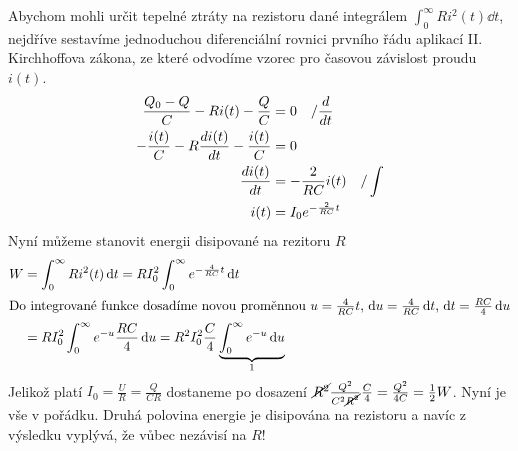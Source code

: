 \begin{mdframed}[style=mdexam]
\begin{example}
    Abychom mohli určit tepelné ztráty na rezistoru dané integrálem \(\int_{0}^{\infty}
    Ri^2(t)\dd{t}\), nejdříve sestavíme jednoduchou diferenciální rovnici prvního řádu aplikací II.
    Kirchhoffova zákona, ze které odvodíme vzorec pro časovou závislost proudu \(i(t)\). 
    \begin{align*}
      \frac{Q_0 - Q}{C} - Ri(t) - \frac{Q}{C}           &= 0 \quad/\dfrac{d  }{d t}             \\
      -\frac{i(t)}{C} - R\dfrac{d i(t)}{d t} - \frac{i(t)}{C} &= 0                              \\
                                          \dfrac{d i(t)}{d t} &= - \frac{2}{RC}i(t) \quad/\int  \\
                                                   i(t) &= I_0e^{-\frac{2}{RC}t}
    \end{align*}
    Nyní můžeme stanovit energii disipované na rezitoru \(R\)
    \begin{align*}
      W   &= \int_{0}^{\infty}Ri^2(t)\dd{t} = RI_0^2\int_{0}^{\infty}e^{-\frac{4}{RC}t}\dd{t}   \\
      \shortintertext{Do integrované funkce dosadíme novou proměnnou \(u = \frac{4}{RC}t\), \(\dd{u} 
                      = \frac{4}{RC}\dd{t}\), \(\dd{t} = \frac{RC}{4}\dd{u}\)}
          &= RI_0^2\int_{0}^{\infty}e^{-u}\frac{RC}{4}\dd{u} 
          = R^2I_0^2\frac{C}{4}\underbrace{\int_{0}^{\infty}e^{-u}\dd{u}}_1 
      \end{align*}
    Jelikož platí \(I_0 = \frac{U}{R}=\frac{Q}{CR}\) dostaneme po dosazení
    \(\cancel{R^2}\frac{Q^2}{C^2\cancel{R^2}}\frac{C}{4} = \frac{Q^2}{4C}= \frac{1}{2}W\). Nyní je
    vše v pořádku. Druhá polovina energie je disipována na rezistoru a navíc z výsledku vyplývá, že
    vůbec nezávisí na \(R\)!
  \end{example}
\end{mdframed}


